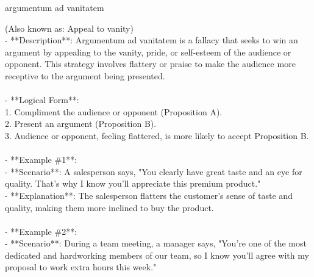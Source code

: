 \documentclass[a4paper,12pt,single,pdftex]{scrartcl}
\begin{document}
argumentum ad vanitatem
    
      (Also known as: Appeal to vanity)
    \\

  
    
      - **Description**: Argumentum ad vanitatem is a fallacy that seeks to win an argument by appealing to the vanity, pride, or self-esteem of the audience or opponent. This strategy involves flattery or praise to make the audience more receptive to the argument being presented.
    \\

    
      
    \\

    
      - **Logical Form**:
    \\

    
        1. Compliment the audience or opponent (Proposition A).
    \\

    
        2. Present an argument (Proposition B).
    \\

    
        3. Audience or opponent, feeling flattered, is more likely to accept Proposition B.
    \\

    
      
    \\

    
      - **Example \#1**:
    \\

    
        - **Scenario**: A salesperson says, "You clearly have great taste and an eye for quality. That's why I know you'll appreciate this premium product."
    \\

    
        - **Explanation**: The salesperson flatters the customer's sense of taste and quality, making them more inclined to buy the product.
    \\

    
      
    \\

    
      - **Example \#2**:
    \\

    
        - **Scenario**: During a team meeting, a manager says, "You're one of the most dedicated and hardworking members of our team, so I know you'll agree with my proposal to work extra hours this week."
    \\
\end{document}
